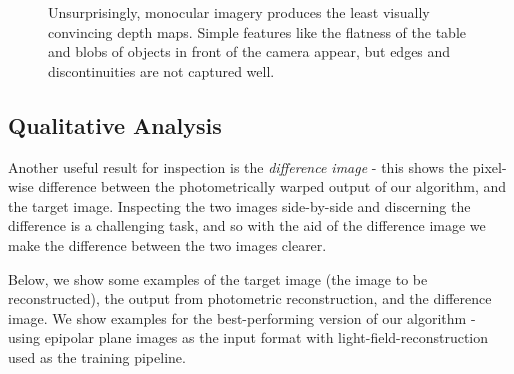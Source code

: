 \begin{figure}[H]
{    }
    \setcounter{subfigure}{0}
    \caption[Depth maps using monocular imagery.]{Unsurprisingly, monocular imagery produces the least visually convincing depth maps. Simple features like the flatness of the table and blobs of objects in front of the camera appear, but edges and discontinuities are not captured well.}
\end{figure}


\subsection{Qualitative Analysis}

Another useful result for inspection is the \textit{difference image} - this shows the pixel-wise difference between the photometrically warped output of our algorithm, and the target image. Inspecting the two images side-by-side and discerning the difference is a challenging task, and so with the aid of the difference image we make the difference between the two images clearer.

Below, we show some examples of the target image (the image to be reconstructed), the output from photometric reconstruction, and the difference image. We show examples for the best-performing version of our algorithm - using epipolar plane images as the input format with light-field-reconstruction used as the training pipeline. 

